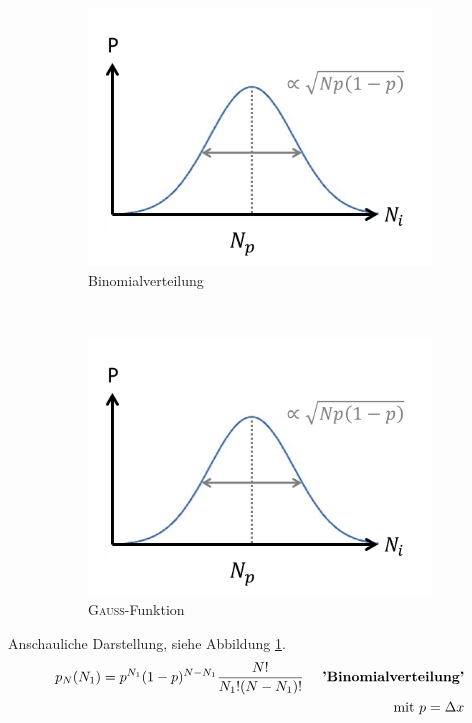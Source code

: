\documentclass[12pt]{article}
\begin{document}
\begin{enumerate}
\begin{itemize}
\begin{figure}[h] %
		\begin{subfigure}[h]{0.5 \textwidth}
		\centering
		\includegraphics[width=\textwidth]{Folie12.png}
		\caption{Binomialverteilung} 
		\label{fig:Binomialverteilung}
		\centering
	\end{subfigure}
	~
	\begin{subfigure}[h]{0.5\textwidth}
		\centering
		\includegraphics[width=\textwidth]{Folie12.png}
		\caption{\textsc{Gauß}-Funktion} 
		\label{fig:Gaussfunktion}
		\centering
	\end{subfigure}
	\caption{ }
\end{figure}
Anschauliche Darstellung, siehe Abbildung \ref{fig:Binomialverteilung}.
\begin{align}
p_N (N_1) = p^{N_1} (1-p)^{N-N_1} \frac{N!}{N_1 ! (N-N_1)!} \quad  \mbox{ \textbf{'Binomialverteilung'}} \\
 \mbox{ mit } p= \Delta x
\end{align}


\end{itemize}
\end{enumerate}
\end{document}
